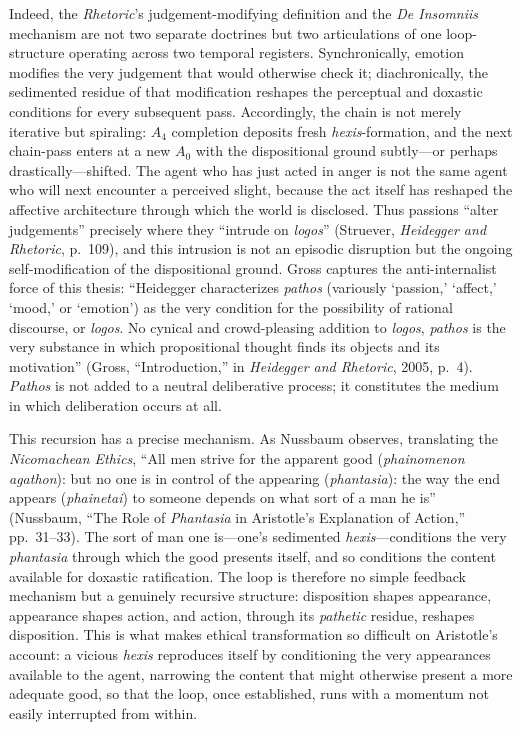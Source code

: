 Indeed, the \textit{Rhetoric}'s judgement-modifying definition and the \textit{De Insomniis} mechanism are not two separate doctrines but two articulations of one loop-structure operating across two temporal registers. Synchronically, emotion modifies the very judgement that would otherwise check it; diachronically, the sedimented residue of that modification reshapes the perceptual and doxastic conditions for every subsequent pass. Accordingly, the chain is not merely iterative but spiraling: $A_4$ completion deposits fresh \textit{hexis}-formation, and the next chain-pass enters at a new $A_0$ with the dispositional ground subtly---or perhaps drastically---shifted. The agent who has just acted in anger is not the same agent who will next encounter a perceived slight, because the act itself has reshaped the affective architecture through which the world is disclosed. Thus passions ``alter judgements'' precisely where they ``intrude on \textit{logos}'' (Struever, \textit{Heidegger and Rhetoric}, p.~109), and this intrusion is not an episodic disruption but the ongoing self-modification of the dispositional ground. Gross captures the anti-internalist force of this thesis: ``Heidegger characterizes \textit{pathos} (variously `passion,' `affect,' `mood,' or `emotion') as the very condition for the possibility of rational discourse, or \textit{logos}. No cynical and crowd-pleasing addition to \textit{logos}, \textit{pathos} is the very substance in which propositional thought finds its objects and its motivation'' (Gross, ``Introduction,'' in \textit{Heidegger and Rhetoric}, 2005, p.~4). \textit{Pathos} is not added to a neutral deliberative process; it constitutes the medium in which deliberation occurs at all.

This recursion has a precise mechanism. As Nussbaum observes, translating the \textit{Nicomachean Ethics}, ``All men strive for the apparent good (\textit{phainomenon agathon}): but no one is in control of the appearing (\textit{phantasia}): the way the end appears (\textit{phainetai}) to someone depends on what sort of a man he is'' (Nussbaum, ``The Role of \textit{Phantasia} in Aristotle's Explanation of Action,'' pp.~31--33). The sort of man one is---one's sedimented \textit{hexis}---conditions the very \textit{phantasia} through which the good presents itself, and so conditions the content available for doxastic ratification. The loop is therefore no simple feedback mechanism but a genuinely recursive structure: disposition shapes appearance, appearance shapes action, and action, through its \textit{pathetic} residue, reshapes disposition. This is what makes ethical transformation so difficult on Aristotle's account: a vicious \textit{hexis} reproduces itself by conditioning the very appearances available to the agent, narrowing the content that might otherwise present a more adequate good, so that the loop, once established, runs with a momentum not easily interrupted from within.

